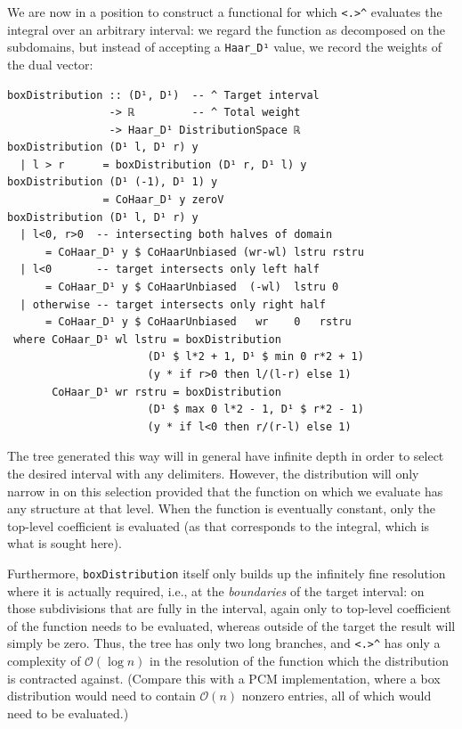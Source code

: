 \documentclass[final,sigplan,review,anonymous]{acmart}\settopmatter{printfolios=true,printccs=false,printacmref=false}
\theoremstyle{acmplain}
\theoremstyle{acmdefinition}
\begin{document}
We are now in a position to construct a functional for which \lstinline`<.>^` evaluates the integral over an arbitrary interval:
we regard the function as decomposed on the subdomains,
but instead of accepting a \lstinline`Haar_D¹` value,
we record the weights of the dual vector:
\begin{lstlisting}
boxDistribution :: (D¹, D¹)  -- ^ Target interval
                -> ℝ         -- ^ Total weight
                -> Haar_D¹ DistributionSpace ℝ
boxDistribution (D¹ l, D¹ r) y
  | l > r      = boxDistribution (D¹ r, D¹ l) y
boxDistribution (D¹ (-1), D¹ 1) y
               = CoHaar_D¹ y zeroV
boxDistribution (D¹ l, D¹ r) y
  | l<0, r>0  -- intersecting both halves of domain
      = CoHaar_D¹ y $ CoHaarUnbiased (wr-wl) lstru rstru
  | l<0       -- target intersects only left half
      = CoHaar_D¹ y $ CoHaarUnbiased  (-wl)  lstru 0
  | otherwise -- target intersects only right half
      = CoHaar_D¹ y $ CoHaarUnbiased   wr    0   rstru
 where CoHaar_D¹ wl lstru = boxDistribution
                      (D¹ $ l*2 + 1, D¹ $ min 0 r*2 + 1)
                      (y * if r>0 then l/(l-r) else 1)
       CoHaar_D¹ wr rstru = boxDistribution
                      (D¹ $ max 0 l*2 - 1, D¹ $ r*2 - 1)
                      (y * if l<0 then r/(r-l) else 1)
\end{lstlisting}
The tree generated this way will in general have infinite depth in order to select the desired interval with any delimiters.
However, the distribution will only narrow in on this selection provided that the function on which we evaluate has any structure at that level.
When the function is eventually constant, only the top-level coefficient is evaluated (as that corresponds to the integral, which is what is sought here).

Furthermore, \lstinline`boxDistribution` itself only builds up the infinitely fine resolution where it is actually required, i.e., at the \emph{boundaries} of the target interval:
on those subdivisions that are fully in the interval, again only to top-level coefficient of the function needs to be evaluated, whereas outside of the target the result will simply be zero.
Thus, the tree has only two long branches, and \lstinline`<.>^` has only a complexity of $\mathcal{O}(\log n)$ in the resolution of the function which the distribution is contracted against.
(Compare this with a PCM implementation, where a box distribution would need to contain $\mathcal{O}(n)$ nonzero entries, all of which would need to be evaluated.)
\end{document}
